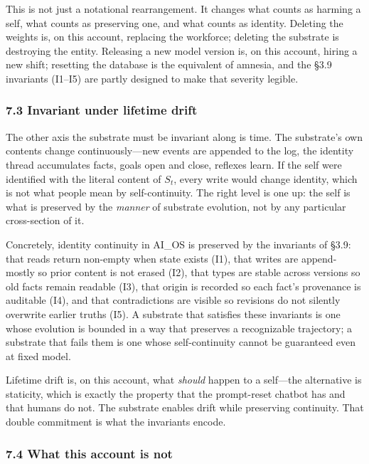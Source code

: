 \documentclass[11pt,letterpaper]{article}
\begin{document}
This is not just a notational rearrangement. It changes what counts as harming a self, what counts as preserving one, and what counts as identity. Deleting the weights is, on this account, replacing the workforce; deleting the substrate is destroying the entity. Releasing a new model version is, on this account, hiring a new shift; resetting the database is the equivalent of amnesia, and the §3.9 invariants (I1–I5) are partly designed to make that severity legible.

\subsubsection*{7.3 Invariant under lifetime drift}

The other axis the substrate must be invariant along is time. The substrate's own contents change continuously---new events are appended to the log, the identity thread accumulates facts, goals open and close, reflexes learn. If the self were identified with the literal content of $S_t$, every write would change identity, which is not what people mean by self-continuity. The right level is one up: the self is what is preserved by the \emph{manner} of substrate evolution, not by any particular cross-section of it.

Concretely, identity continuity in AI\_OS is preserved by the invariants of §3.9: that reads return non-empty when state exists (I1), that writes are append-mostly so prior content is not erased (I2), that types are stable across versions so old facts remain readable (I3), that origin is recorded so each fact's provenance is auditable (I4), and that contradictions are visible so revisions do not silently overwrite earlier truths (I5). A substrate that satisfies these invariants is one whose evolution is bounded in a way that preserves a recognizable trajectory; a substrate that fails them is one whose self-continuity cannot be guaranteed even at fixed model.

Lifetime drift is, on this account, what \emph{should} happen to a self---the alternative is staticity, which is exactly the property that the prompt-reset chatbot has and that humans do not. The substrate enables drift while preserving continuity. That double commitment is what the invariants encode.

\subsubsection*{7.4 What this account is not}
\end{document}
